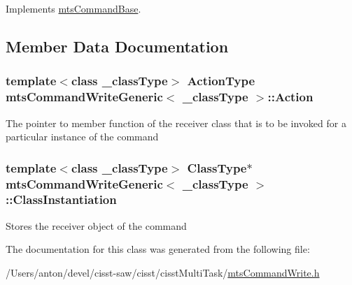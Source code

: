 Implements \hyperlink{classmts_command_base_a0885ce7a5321d7b672694ade780b9d64}{mts\+Command\+Base}.



\subsection{Member Data Documentation}
\hypertarget{classmts_command_write_generic_ac0a7ab9bf5bf14479f46d2f32a259de6}{}
\subsubsection[{Action}]{\setlength{\rightskip}{0pt plus 5cm}template$<$class \+\_\+class\+Type$>$ {\bf Action\+Type} {\bf mts\+Command\+Write\+Generic}$<$ \+\_\+class\+Type $>$\+::Action\hspace{0.3cm}{\ttfamily [protected]}}\label{classmts_command_write_generic_ac0a7ab9bf5bf14479f46d2f32a259de6}
The pointer to member function of the receiver class that is to be invoked for a particular instance of the command \hypertarget{classmts_command_write_generic_a9417d03cc4cc313622021ba6a94f1994}{}
\subsubsection[{Class\+Instantiation}]{\setlength{\rightskip}{0pt plus 5cm}template$<$class \+\_\+class\+Type$>$ {\bf Class\+Type}$\ast$ {\bf mts\+Command\+Write\+Generic}$<$ \+\_\+class\+Type $>$\+::Class\+Instantiation\hspace{0.3cm}{\ttfamily [protected]}}\label{classmts_command_write_generic_a9417d03cc4cc313622021ba6a94f1994}
Stores the receiver object of the command 

The documentation for this class was generated from the following file\+:\begin{DoxyCompactItemize}
\item 
/\+Users/anton/devel/cisst-\/saw/cisst/cisst\+Multi\+Task/\hyperlink{mts_command_write_8h}{mts\+Command\+Write.\+h}\end{DoxyCompactItemize}
